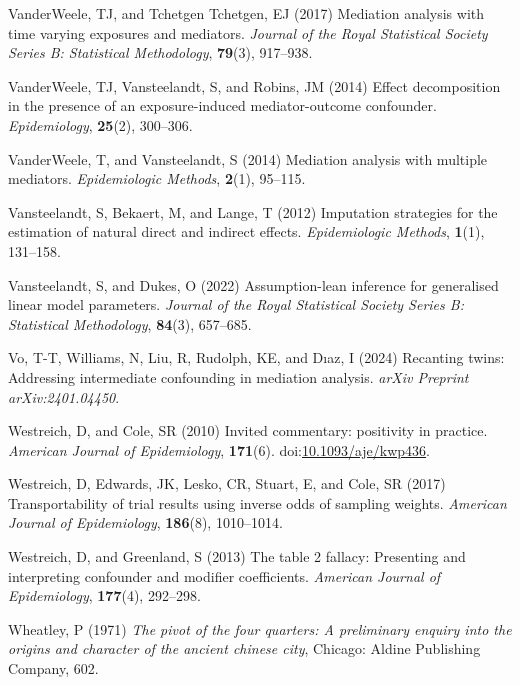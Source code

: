 \documentclass[
  single column]{article}
\newlength{\cslhangindent}
\newenvironment{CSLReferences}[2] %
 {\begin{list}{}{%
  \setlength{\itemindent}{0pt}
  \setlength{\leftmargin}{0pt}
  \setlength{\parsep}{0pt}
  \ifodd #1
   \setlength{\leftmargin}{\cslhangindent}
   \setlength{\itemindent}{-1\cslhangindent}
  \fi
  \setlength{\itemsep}{#2\baselineskip}}}
 {\end{list}}
\begin{document}
\begin{CSLReferences}{1}{0}
VanderWeele, TJ, and Tchetgen Tchetgen, EJ (2017) Mediation analysis
with time varying exposures and mediators. \emph{Journal of the Royal
Statistical Society Series B: Statistical Methodology}, \textbf{79}(3),
917--938.

VanderWeele, TJ, Vansteelandt, S, and Robins, JM (2014) Effect
decomposition in the presence of an exposure-induced mediator-outcome
confounder. \emph{Epidemiology}, \textbf{25}(2), 300--306.

VanderWeele, T, and Vansteelandt, S (2014) Mediation analysis with
multiple mediators. \emph{Epidemiologic Methods}, \textbf{2}(1),
95--115.

Vansteelandt, S, Bekaert, M, and Lange, T (2012) Imputation strategies
for the estimation of natural direct and indirect effects.
\emph{Epidemiologic Methods}, \textbf{1}(1), 131--158.

Vansteelandt, S, and Dukes, O (2022) Assumption-lean inference for
generalised linear model parameters. \emph{Journal of the Royal
Statistical Society Series B: Statistical Methodology}, \textbf{84}(3),
657--685.

Vo, T-T, Williams, N, Liu, R, Rudolph, KE, and Dıaz, I (2024) Recanting
twins: Addressing intermediate confounding in mediation analysis.
\emph{arXiv Preprint arXiv:2401.04450}.

Westreich, D, and Cole, SR (2010) Invited commentary: positivity in
practice. \emph{American Journal of Epidemiology}, \textbf{171}(6).
doi:\href{https://doi.org/10.1093/aje/kwp436}{10.1093/aje/kwp436}.

Westreich, D, Edwards, JK, Lesko, CR, Stuart, E, and Cole, SR (2017)
Transportability of trial results using inverse odds of sampling
weights. \emph{American Journal of Epidemiology}, \textbf{186}(8),
1010--1014.

Westreich, D, and Greenland, S (2013) The table 2 fallacy: Presenting
and interpreting confounder and modifier coefficients. \emph{American
Journal of Epidemiology}, \textbf{177}(4), 292--298.

Wheatley, P (1971) \emph{The pivot of the four quarters: A preliminary
enquiry into the origins and character of the ancient chinese city},
Chicago: Aldine Publishing Company, 602.


\end{CSLReferences}
\end{document}
